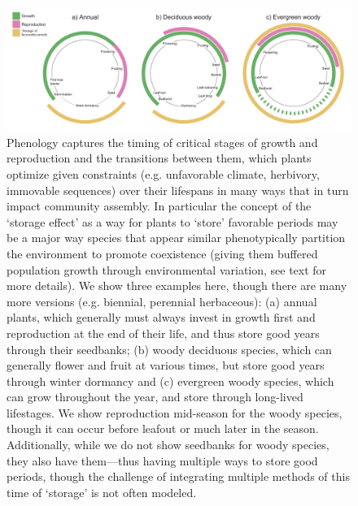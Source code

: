 \documentclass[11pt]{article}
\begin{document}
\begin{figure}[h!]
\centering
\includegraphics[width=1\textwidth]{..//figures/JN_conceptfigs/phenologycircles/phenologycircles_2023.1.13.pdf}
\caption{Phenology captures the timing of critical stages of growth and reproduction and the transitions between them, which plants optimize given constraints (e.g. unfavorable climate, herbivory, immovable sequences) over their lifespans in many ways that in turn impact community assembly. In particular the concept of the `storage effect' as a way for plants to `store' favorable periods may be a major way species that appear similar phenotypically partition the environment to promote coexistence (giving them buffered population growth through environmental variation, see text for more details). We show three examples here, though there are many more versions (e.g. biennial, perennial herbaceous): (a) annual plants, which generally must always invest in growth first and reproduction at the end of their life, and thus store good years through their seedbanks; (b) woody deciduous species, which can generally flower and fruit at various times, but store good years through winter dormancy and (c) evergreen woody species, which can grow throughout the year, and store through long-lived lifestages. We show reproduction mid-season for the woody species, though it can occur before leafout or much later in the season. Additionally, while we do not show seedbanks for woody species, they also have them---thus having multiple ways to store good periods, though the challenge of integrating multiple methods of this time of `storage' is not often modeled.}
 \label{fig:phenologycircles}
\end{figure}

\clearpage
\end{document}

